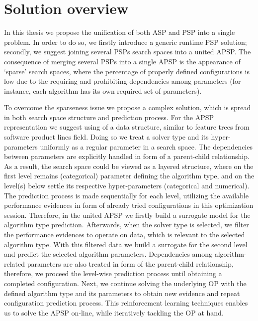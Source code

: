 \section{Solution overview}
In this thesis we propose the unification of both ASP and PSP into a single problem. In order to do so, we firstly introduce a generic runtime PSP solution; secondly, we suggest joining several PSPs search spaces into a united APSP. The consequence of merging several PSPs into a single APSP is the appearance of `sparse' search spaces, where the percentage of properly defined configurations is low due to the requiring and prohibiting dependencies among parameters (for instance, each algorithm has its own required set of parameters).

To overcome the sparseness issue we propose a complex solution, which is spread in both search space structure and prediction process. For the APSP representation we suggest using of a data structure, similar to feature trees from software product lines field. Doing so we treat a solver type and its hyper-parameters uniformly as a regular parameter in a search space. The dependencies between parameters are explicitly handled in form of a parent-child relationship. As a result, the search space could be viewed as a layered structure, where on the first level remains (categorical) parameter defining the algorithm type, and on the level(s) below settle its respective hyper-parameters (categorical and numerical). The prediction process is made sequentially for each level, utilizing the available performance evidences in form of already tried configurations in this optimization session. Therefore, in the united APSP we firstly build a surrogate model for the algorithm type prediction. Afterwards, when the solver type is selected, we filter the performance evidences to operate on data, which is relevant to the selected algorithm type. With this filtered data we build a surrogate for the second level and predict the selected algorithm parameters. Dependencies among algorithm-related parameters are also treated in form of the parent-child relationship, therefore, we proceed the level-wise prediction process until obtaining a completed configuration. Next, we continue solving the underlying OP with the defined algorithm type and its parameters to obtain new evidence and repeat configuration prediction process. This reinforcement learning techniques enables us to solve the APSP on-line, while iteratively tackling the OP at hand. 

